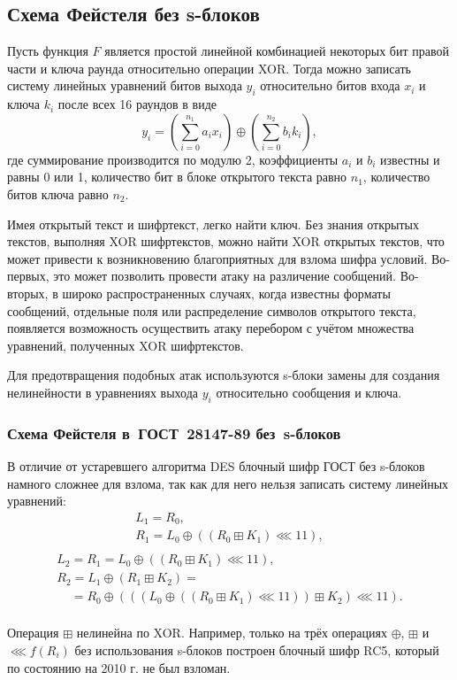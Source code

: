 \subsection{Схема Фейстеля без s-блоков}

Пусть функция $F$ является простой линейной комбинацией некоторых бит правой части и ключа раунда относительно операции XOR. Тогда можно записать систему линейных уравнений битов выхода $y_i$ относительно битов входа $x_i$ и ключа $k_i$ после всех 16 раундов в виде
    \[ y_i = \left(\sum_{i=0}^{n_1} a_i x_i\right) \oplus \left(\sum_{i=0}^{n_2} b_i k_i\right), \]
где суммирование производится по модулю 2, коэффициенты $a_i$ и $b_i$ известны и равны 0 или 1, количество бит в блоке открытого текста равно $n_1$, количество битов ключа равно $n_2$.

Имея открытый текст и шифртекст, легко найти ключ. Без знания открытых текстов, выполняя XOR шифртекстов, можно найти XOR открытых текстов, что может привести к возникновению благоприятных для взлома шифра условий. Во-первых, это может позволить провести атаку на различение сообщений. Во-вторых, в широко распространенных случаях, когда известны форматы сообщений, отдельные поля или распределение символов открытого текста, появляется возможность осуществить атаку перебором с учётом множества уравнений, полученных XOR шифртекстов.

Для предотвращения подобных атак используются s-блоки замены для создания нелинейности в уравнениях выхода $y_i$ относительно сообщения и ключа.


\subsubsection[Схема Фейстеля в ГОСТ 28147-89 без s-блоков]{Схема Фейстеля в~ГОСТ~28147-89 без~s-блоков}

В отличие от устаревшего алгоритма DES блочный шифр ГОСТ без s-блоков намного сложнее для взлома, так как для него нельзя записать систему линейных уравнений:
\[
    \begin{array}{l}
        L_1 = R_0, \\
        R_1 = L_0 \oplus ((R_0 \boxplus K_1) \lll 11), \\
    \end{array}
\] \[
    \begin{array}{l}
        L_2 = R_1 = L_0 \oplus ((R_0 \boxplus K_1) \lll 11), \\
        R_2 = L_1 \oplus (R_1 \boxplus K_2)  = \\
        ~~~~~= R_0 \oplus (((L_0 \oplus ((R_0 \boxplus K_1) \lll 11)) \boxplus K_2) \lll 11). \\
    \end{array}
\]

Операция $\boxplus$ нелинейна по XOR. Например, только на трёх операциях $\oplus$, $\boxplus$ и $\lll f(R_i)$ без использования s-блоков построен блочный шифр RC5, который по состоянию на 2010 г. не был взломан.
